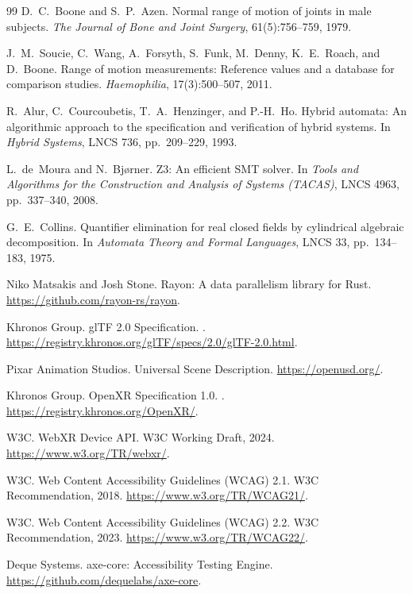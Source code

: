 \documentclass[11pt,letterpaper]{article}
\begin{document}
\begin{thebibliography}{99}
D.~C.~Boone and S.~P.~Azen.
\newblock Normal range of motion of joints in male subjects.
\newblock \emph{The Journal of Bone and Joint Surgery}, 61(5):756--759, 1979.

J.~M.~Soucie, C.~Wang, A.~Forsyth, S.~Funk, M.~Denny, K.~E.~Roach, and D.~Boone.
\newblock Range of motion measurements: Reference values and a database for comparison studies.
\newblock \emph{Haemophilia}, 17(3):500--507, 2011.

R.~Alur, C.~Courcoubetis, T.~A.~Henzinger, and P.-H.~Ho.
\newblock Hybrid automata: An algorithmic approach to the specification and verification of hybrid systems.
\newblock In \emph{Hybrid Systems}, LNCS 736, pp.~209--229, 1993.

L.~de~Moura and N.~Bj{\o}rner.
\newblock Z3: An efficient SMT solver.
\newblock In \emph{Tools and Algorithms for the Construction and Analysis of Systems (TACAS)}, LNCS 4963, pp.~337--340, 2008.

G.~E.~Collins.
\newblock Quantifier elimination for real closed fields by cylindrical algebraic decomposition.
\newblock In \emph{Automata Theory and Formal Languages}, LNCS 33, pp.~134--183, 1975.

Niko Matsakis and Josh Stone.
\newblock Rayon: A data parallelism library for Rust.
\newblock \url{https://github.com/rayon-rs/rayon}.

Khronos Group.
\newblock glTF 2.0 Specification.
. \url{https://registry.khronos.org/glTF/specs/2.0/glTF-2.0.html}.

Pixar Animation Studios.
\newblock Universal Scene Description.
\newblock \url{https://openusd.org/}.

Khronos Group.
\newblock OpenXR Specification 1.0.
. \url{https://registry.khronos.org/OpenXR/}.

W3C.
\newblock WebXR Device API.
\newblock W3C Working Draft, 2024. \url{https://www.w3.org/TR/webxr/}.

W3C.
\newblock Web Content Accessibility Guidelines (WCAG) 2.1.
\newblock W3C Recommendation, 2018. \url{https://www.w3.org/TR/WCAG21/}.

W3C.
\newblock Web Content Accessibility Guidelines (WCAG) 2.2.
\newblock W3C Recommendation, 2023. \url{https://www.w3.org/TR/WCAG22/}.

Deque Systems.
\newblock axe-core: Accessibility Testing Engine.
\newblock \url{https://github.com/dequelabs/axe-core}.


\end{thebibliography}
\end{document}
